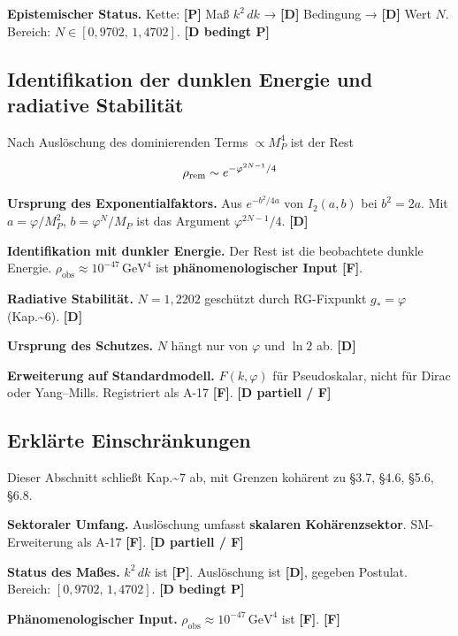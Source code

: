 ﻿\documentclass[11pt,letterpaper]{article}
\begin{document}
\textbf{Epistemischer Status.} Kette: \textbf{[P]} Maß $k^2\,dk$ → \textbf{[D]} Bedingung → \textbf{[D]} Wert $N$. Bereich: $N \in [0{,}9702,\,1{,}4702]$. \textbf{[D bedingt P]}
\subsection{Identifikation der dunklen Energie und radiative Stabilität}
Nach Auslöschung des dominierenden Terms $\propto M_P^4$ ist der Rest

\begin{equation*}
  \resizebox{\ifdim\width>\linewidth \linewidth\else\width\fi}{!}{$\displaystyle \rho_{\text{rem}} \sim e^{-\varphi^{2N-1}/4}$}
\end{equation*}

\textbf{Ursprung des Exponentialfaktors.} Aus $e^{-b^2/4a}$ von $I_2(a, b)$ bei $b^2 = 2a$. Mit $a = \varphi/M_P^2$, $b = \varphi^N/M_P$ ist das Argument $\varphi^{2N-1}/4$. \textbf{[D]}

\textbf{Identifikation mit dunkler Energie.} Der Rest ist die beobachtete dunkle Energie. $\rho_{\text{obs}} \approx 10^{-47}\,\text{GeV}^4$ ist \textbf{phänomenologischer Input [F]}.

\textbf{Radiative Stabilität.} $N = 1{,}2202$ geschützt durch RG-Fixpunkt $g_* = \varphi$ (Kap.\textasciitilde{}6). \textbf{[D]}

\textbf{Ursprung des Schutzes.} $N$ hängt nur von $\varphi$ und $\ln 2$ ab. \textbf{[D]}

\textbf{Erweiterung auf Standardmodell.} $F(k, \varphi)$ für Pseudoskalar, nicht für Dirac oder Yang--Mills. Registriert als A-17 \textbf{[F]}. \textbf{[D partiell / F]}
\subsection{Erklärte Einschränkungen}
Dieser Abschnitt schließt Kap.\textasciitilde{}7 ab, mit Grenzen kohärent zu §3.7, §4.6, §5.6, §6.8.

\textbf{Sektoraler Umfang.} Auslöschung umfasst \textbf{skalaren Kohärenzsektor}. SM-Erweiterung als A-17 \textbf{[F]}. \textbf{[D partiell / F]}

\textbf{Status des Maßes.} $k^2\,dk$ ist \textbf{[P]}. Auslöschung ist \textbf{[D]}, gegeben Postulat. Bereich: $[0{,}9702,\,1{,}4702]$. \textbf{[D bedingt P]}

\textbf{Phänomenologischer Input.} $\rho_{\text{obs}} \approx 10^{-47}\,\text{GeV}^4$ ist \textbf{[F]}. \textbf{[F]}
\end{document}
